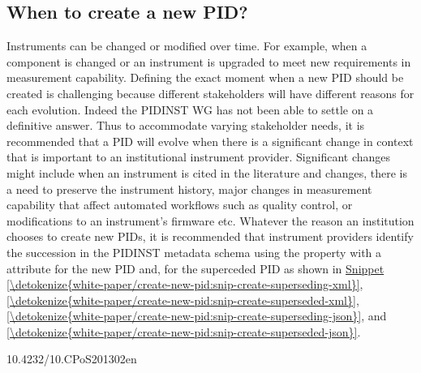 \documentclass[a4paper,10pt,english]{sphinxmanual}
\begin{document}
\subsection{When to create a new PID?}
\label{\detokenize{white-paper/create-new-pid:when-to-create-a-new-pid}}\label{\detokenize{white-paper/create-new-pid::doc}}
\sphinxAtStartPar
Instruments can be changed or modified over time. For example, when a
component is changed or an instrument is upgraded to meet new
requirements in measurement capability. Defining the exact moment when a
new PID should be created is challenging because different stakeholders
will have different reasons for each evolution. Indeed the PIDINST WG
has not been able to settle on a definitive answer. Thus to accommodate
varying stakeholder needs, it is recommended that a PID will evolve when
there is a significant change in context that is important to an
institutional instrument provider. Significant changes might include
when an instrument is cited in the literature and changes, there is a
need to preserve the instrument history, major changes in measurement
capability that affect automated workflows such as quality control, or
modifications to an instrument’s firmware etc. Whatever the reason an
institution chooses to create new PIDs, it is recommended that
instrument providers identify the succession in the PIDINST metadata
schema using the  property with a 
attribute  for the new PID and, 
for the superceded PID as shown in
\hyperref[\detokenize{white-paper/create-new-pid:snip-create-superseding-xml}]{Snippet \ref{\detokenize{white-paper/create-new-pid:snip-create-superseding-xml}}},
\hyperref[\detokenize{white-paper/create-new-pid:snip-create-superseded-xml}]{\ref{\detokenize{white-paper/create-new-pid:snip-create-superseded-xml}}},
\hyperref[\detokenize{white-paper/create-new-pid:snip-create-superseding-json}]{\ref{\detokenize{white-paper/create-new-pid:snip-create-superseding-json}}}, and
\hyperref[\detokenize{white-paper/create-new-pid:snip-create-superseded-json}]{\ref{\detokenize{white-paper/create-new-pid:snip-create-superseded-json}}}.
\def\sphinxLiteralBlockLabel{\label{\detokenize{white-paper/create-new-pid:snip-create-superseding-xml}}}
\begin{sphinxVerbatim}[commandchars=\\\{\}]
       10.4232/10.CPoS\PYGZhy{}2013\PYGZhy{}02en
\end{sphinxVerbatim}
\end{document}
